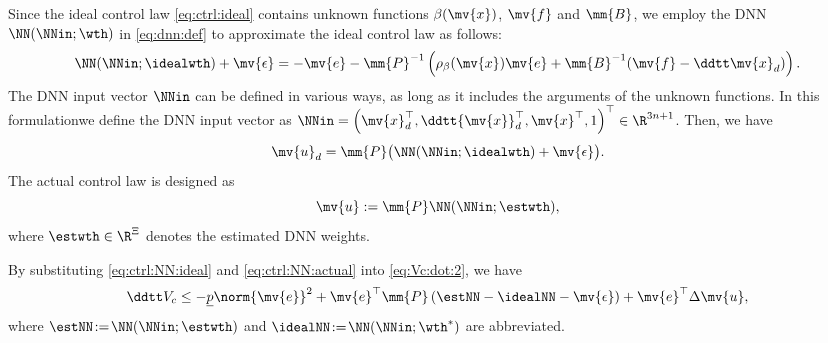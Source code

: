 \documentclass[letterpaper, journal]{IEEEtran}
\providecommand{\DIFadd}[1]{{\protect\color{blue}\uwave{#1}}} %
\providecommand{\DIFdel}[1]{{\protect\color{red}\sout{#1}}} %
\providecommand{\DIFaddbegin}{} %
\providecommand{\DIFaddend}{} %
\providecommand{\DIFdelbegin}{} %
\providecommand{\DIFdelend}{} %
\begin{document}
Since the ideal control law \eqref{eq:ctrl:ideal} contains unknown functions \DIFdelbegin \DIFdel{$\beta(\mv{x})$}\DIFdelend \DIFaddbegin \DIFadd{$\rho_{\beta}(\mv{x})$}\DIFaddend , $\mv{f}$ and $\mm{B}$, we employ the DNN $\NN(\NNin;\wth)$ in \eqref{eq:dnn:def} to approximate the ideal control law as follows:
\DIFdelbegin %
\DIFdelend \DIFaddbegin \begin{equation*}
  \NN(\NNin;\idealwth)
  +
  \mv{\epsilon}
  =
  -\mv{e}
  -
  \mm{P}^{-1}
  \left(
  \rho_{\beta}(\mv{x})
  \mv{e}
  +
  \mm{B}^{-1}
  (
    \mv{f}
    -
    \ddtt \mv{x}_d
  )
  \right)
  .
\end{equation*}\DIFaddend 
The DNN input vector $\NNin$ can be defined in various ways, as long as it includes the arguments of the unknown functions.
In this formulation\DIFaddbegin \DIFadd{, }\DIFaddend we define the DNN input vector as
$
  \NNin 
  = 
  \left(
    \mv{x}_d^\top, 
    \ddtt{\mv{x}}_d^\top, 
    \mv{x}^\top, 
    1 
  \right)^\top
  \in\R^{3n+1}
$.
Then, we have 
\begin{equation} \label{eq:ctrl:NN:ideal}
  \mv{u}_d
  =
  \mm{P}
  \big(
    \NN(\NNin;\idealwth)
    +
    \mv{\epsilon}
  \big)
  .
\end{equation}
The actual control law is designed as 
\begin{equation} \label{eq:ctrl:NN:actual}
  \mv{u}
  :=
  \mm{P}
  \NN(\NNin;\estwth)
  ,
\end{equation}
where $\estwth\in\R^{\Xi}$ denotes the estimated DNN weights.

By substituting \eqref{eq:ctrl:NN:ideal} and \eqref{eq:ctrl:NN:actual} into \eqref{eq:Vc:dot:2}, we have
\begin{equation} \label{eq:Vc:dot:3}
  \ddtt V_c
  \le
  - \underline{p}
  \norm{\mv{e}}^2
  +
  \mv{e}^\top\mm{P}
  \left(
    \estNN - \idealNN
    - \mv{\epsilon}
  \right)
  +
  \mv{e}^\top
  \Delta\mv{u}
  ,
\end{equation}
where $\estNN\!:=\!\NN(\NNin;\estwth)$ and $\idealNN\!:=\!\NN(\NNin;\wth^*)$ are abbreviated.
\end{document}
